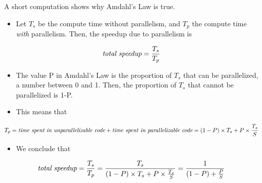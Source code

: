 \documentclass[letterpaper,10pt,openany,oneside]{sphinxmanual}
\begin{document}
A short computation shows why Amdahl's Law is true.
\begin{itemize}
\item {} 
Let $T_s$ be the compute time without parallelism, and $T_p$ the compute time \emph{with} parallelism. Then, the speedup due to parallelism is

\end{itemize}
\begin{gather}
\begin{split}\textit{total speedup} = \frac{T_s}{T_p}\end{split}\notag
\end{gather}\begin{itemize}
\item {} 
The value P in Amdahl's Law is the proportion of $T_s$ that can be parallelized, a number between 0 and 1. Then, the proportion of $T_s$ that cannot be parallelized is 1-P.

\item {} 
This means that

\end{itemize}
\begin{gather}
\begin{split}T_p = \textit{time spent in unparallelizable code} + \textit{time spent in parallelizable code} = (1 - P) \times T_s + P \times \frac{T_s}{S}\end{split}\notag
\end{gather}\begin{itemize}
\item {} 
We conclude that

\end{itemize}
\begin{gather}
\begin{split}\textit{total speedup} = \frac{T_s}{T_p} = \frac{T_s}{(1 - P) \times T_s + P \times \frac{T_s}{S}} = \frac{1}{(1-P) +  \frac{P}{S}}\end{split}\notag
\end{gather}
\end{document}
